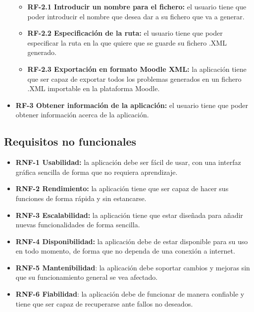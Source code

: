 \begin{itemize}
  \begin{itemize}
  \tightlist
    \item
    \textbf{RF-2.1 Introducir un nombre para el fichero:} el usuario tiene que poder introducir el nombre que desea dar a su fichero que va a generar.
    \item 
    \textbf{RF-2.2 Especificación de la ruta:} el usuario tiene que poder especificar la ruta en la que quiere que se guarde su fichero .XML generado.
  \item
    \textbf{RF-2.3 Exportación en formato Moodle XML:} la aplicación tiene que ser capaz de exportar todos los problemas generados en un fichero .XML importable en la plataforma Moodle.
  \end{itemize}

\item
    \textbf{RF-3 Obtener información de la aplicación:} el usuario tiene que poder obtener información acerca de la aplicación.

\end{itemize}

\subsection{Requisitos no funcionales}\label{requisitos-no-funcionales}
\begin{itemize}
\tightlist
\item
  \textbf{RNF-1 Usabilidad:} la aplicación debe ser fácil de usar, con una interfaz gráfica sencilla de forma que no requiera aprendizaje.
\item
  \textbf{RNF-2 Rendimiento:} la aplicación tiene que ser capaz de hacer sus funciones de forma rápida y sin estancarse.
\item
  \textbf{RNF-3 Escalabilidad:} la aplicación tiene que
  estar diseñada para añadir nuevas funcionalidades de forma sencilla.
\item
  \textbf{RNF-4 Disponibilidad:} la aplicación debe de estar disponible para su uso en todo momento, de forma que no dependa de una conexión a internet.
\item
  \textbf{RNF-5 Mantenibilidad}: la aplicación debe soportar cambios y mejoras sin que su funcionamiento general se vea afectado.
\item
  \textbf{RNF-6 Fiabilidad}: la aplicación debe de funcionar de manera confiable y tiene que ser capaz de recuperarse ante fallos no deseados.
  
\end{itemize}

